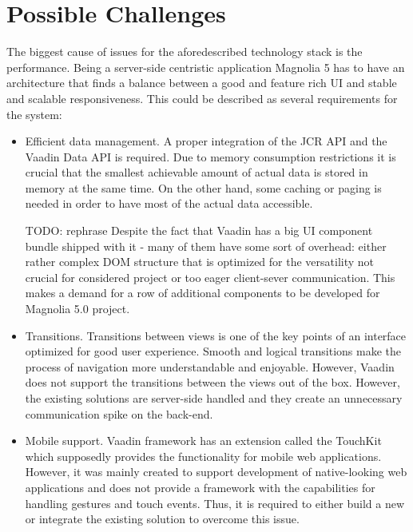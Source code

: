 \section{Possible Challenges}
The biggest cause of issues for the aforedescribed technology stack is the
performance. Being a server-side centristic application Magnolia 5 has to have
an architecture that finds a balance between a good and feature rich UI and
stable and scalable responsiveness. This could be described as several
requirements for the system:

\begin{itemize}
  \item Efficient data management. A proper integration of the JCR API and the
  Vaadin Data API is required. Due to memory consumption restrictions it is
  crucial that the smallest achievable amount of actual data is stored in memory
  at the same time. On the other hand, some caching or paging is needed in order
  to have most of the actual data accessible.
  
  \item [TODO: rephrase] Despite the fact that Vaadin has a big UI component
  bundle shipped with it - many of them have some sort of overhead:
  either rather complex DOM structure that is optimized for the versatility not
  crucial for considered project or too eager client-sever communication. This
  makes a demand for a row of additional components to be developed for Magnolia
  5.0 project.

  \item Transitions. Transitions between views is one of the key points of an
  interface optimized for good user experience. Smooth and logical transitions
  make the process of navigation more understandable and enjoyable. However,
  Vaadin does not support the transitions between the views out of the box.
  However, the existing solutions are server-side handled and they create an
  unnecessary communication spike on the back-end.
  
  \item Mobile support. Vaadin framework has an extension called the TouchKit
  which supposedly provides the functionality for mobile web applications.
  However, it was mainly created to support development of native-looking web
  applications and does not provide a framework with the capabilities for
  handling gestures and touch events. Thus, it is required to either build a new
  or integrate the existing solution to overcome this issue.
\end{itemize} 
 
